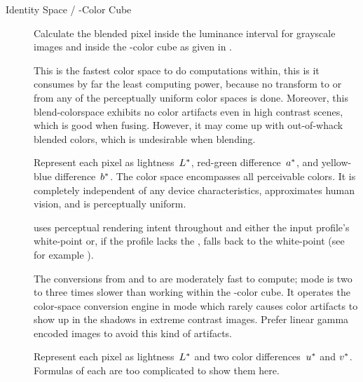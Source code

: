 \begin{description}
\item[Identity Space / \acronym{RGB}-Color Cube]\itemend
  Calculate the blended pixel inside the luminance interval 
  for grayscale images and inside the -color cube as given in
  .

  This is the fastest color space to do computations within, this is it consumes by far the
  least computing power, because no transform to or from any of the perceptually uniform color
  spaces is done.  Moreover, this blend-colorspace exhibits no color artifacts even in high
  contrast scenes, which is good when fusing.  However, it may come up with out-of-whack blended
  colors, which is undesirable when blending.

\item[\urlmark{\wikipedialabcolorspace}{\acronym{L*a*b*}}]\itemend\urltext
  Represent each pixel as lightness~$L\mbox{${}^{*}$}$, red-green difference~$a\mbox{${}^{*}$}$,
  and yellow-blue difference~$b\mbox{${}^{*}$}$.  The  color space encompasses
  all perceivable colors.  It is completely independent of any device characteristics,
  approximates human vision, and is perceptually uniform.

  \App{} uses perceptual rendering intent throughout and either the input profile's white-point
  or, if the  profile lacks the , falls back to the  white-point (see for example
  ).

  The conversions from and to  are moderately fast to compute; 
  mode is two to three times slower than working within the -color cube.  It
  operates the  color-space conversion engine in
   mode which rarely causes color artifacts to show
  up in the shadows in extreme contrast images.  Prefer linear gamma encoded images to avoid
  this kind of artifacts.

\item[\urlmark{\wikipediacieluvcolorspace}{\acronym{CIEL*u*v*}}]\itemend\urltext
  Represent each pixel as lightness~$L\mbox{${}^{*}$}$ and two color
  differences~$u\mbox{${}^{*}$}$ and $v\mbox{${}^{*}$}$.  Formulas of each are too complicated
  to show them here.


\end{description}
